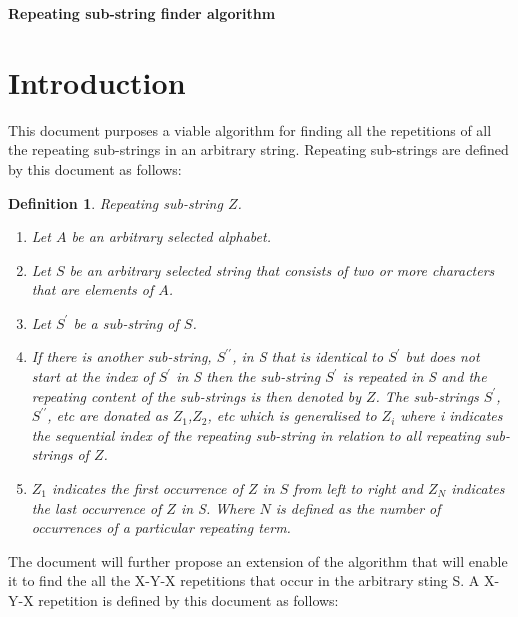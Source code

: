 \documentclass[12pt]{article}
\newtheorem{defn}{Definition}[section]
\begin{document}
\begin{center}
	\LARGE\textbf{Repeating sub-string finder algorithm}
\end{center}

\newpage
\tableofcontents
\newpage
\section{Introduction}
This document purposes a viable algorithm for finding all the repetitions of all the repeating sub-strings in an arbitrary string. Repeating sub-strings are defined by this document as follows:\\
\begin{defn}
    Repeating sub-string $Z$.   
	\begin{enumerate}
		\item Let $A$ be an arbitrary selected alphabet.
		\item Let $S$ be an arbitrary selected string that consists of two or more characters that are elements of $A$.
		\item Let  $S^{\prime}$ be a sub-string of $S$.
		\item If there is another sub-string,  $S^{\prime\prime}$, in S that is identical to  $S^{\prime}$ but does not start at the index of  $S^{\prime}$ in S then the sub-string  $S^{\prime}$ is repeated in S and the repeating content of the sub-strings is then denoted by $Z$. The sub-strings $S^{\prime}$, $S^{\prime\prime}$, etc are donated as $Z_{1}$,$Z_{2}$, etc which is generalised to $Z_{i}$ where i indicates the sequential index of the repeating sub-string in relation to all repeating sub-strings of $Z$.
		\item $Z_{1}$ indicates the first occurrence of $Z$ in $S$ from left to right and $Z_{N}$ indicates the last occurrence of $Z$ in S. Where $N$ is defined as the number of occurrences of a particular repeating term.  
	\end{enumerate}
\end{defn}
The document will further propose an extension of the algorithm that will enable it to find the all the X-Y-X repetitions that occur in the arbitrary sting S. A X-Y-X repetition is defined by this document as follows:   
\end{document}
